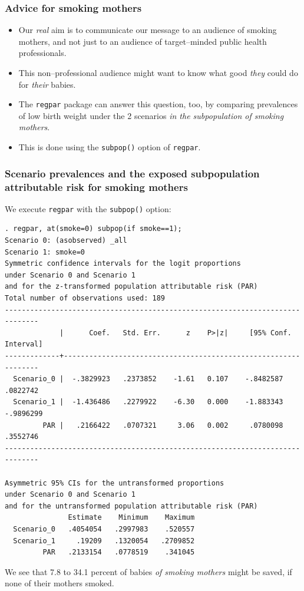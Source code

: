 \documentclass[11pt]{beamer}
\begin{document}
\begin{frame}
\frametitle{Advice for smoking mothers}

\begin{itemize}

\item<2-> Our \textit{real} aim is to communicate our message to an audience of smoking mothers,
and not just to an audience of target--minded public health professionals.

\item<3-> This non--professional audience might want to know what good \textit{they} could do
for \textit{their} babies.

\item<4-> The \texttt{regpar} package can answer this question, too,
by comparing prevalences of low birth weight under the 2 scenarios
\textit{in the subpopulation of smoking mothers}.

\item<5-> This is done using the \texttt{subpop()} option of \texttt{regpar}.

\end{itemize}

\end{frame}

\begin{frame}[fragile]
\frametitle{Scenario prevalences and the exposed subpopulation attributable risk for smoking mothers}

We execute \texttt{regpar} with the \texttt{subpop()} option:

\tiny
\begin{verbatim}
. regpar, at(smoke=0) subpop(if smoke==1);
Scenario 0: (asobserved) _all
Scenario 1: smoke=0
Symmetric confidence intervals for the logit proportions
under Scenario 0 and Scenario 1
and for the z-transformed population attributable risk (PAR)
Total number of observations used: 189
------------------------------------------------------------------------------
             |      Coef.   Std. Err.      z    P>|z|     [95% Conf. Interval]
-------------+----------------------------------------------------------------
  Scenario_0 |  -.3829923   .2373852    -1.61   0.107    -.8482587    .0822742
  Scenario_1 |  -1.436486   .2279922    -6.30   0.000    -1.883343   -.9896299
         PAR |   .2166422   .0707321     3.06   0.002     .0780098    .3552746
------------------------------------------------------------------------------

Asymmetric 95% CIs for the untransformed proportions
under Scenario 0 and Scenario 1
and for the untransformed population attributable risk (PAR)
               Estimate    Minimum    Maximum 
  Scenario_0   .4054054   .2997983    .520557 
  Scenario_1     .19209   .1320054   .2709852 
         PAR   .2133154   .0778519    .341045 
\end{verbatim}
\normalsize

We see that 7.8 to 34.1 percent of babies \textit{of smoking mothers} might be saved,
if none of their mothers smoked.

\end{frame}
\end{document}
